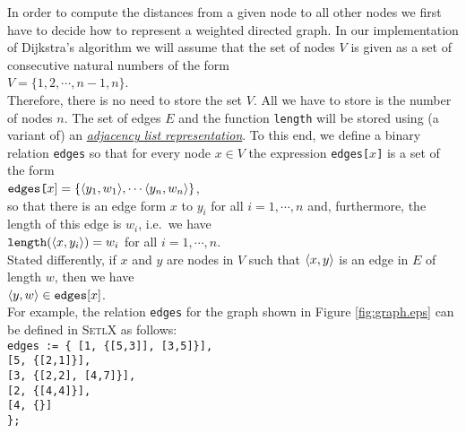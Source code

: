 In order to compute the distances from a given node to all other nodes we first have to decide how
to represent a weighted directed graph.  In our implementation of Dijkstra's algorithm we will
assume that the set of nodes $V$ is given as a set of consecutive natural numbers of the form
\\[0.2cm]
\hspace*{1.3cm}
$V = \{ 1, 2, \cdots, n-1, n \}$.
\\[0.2cm]
Therefore, there is no need to store the set $V$.  All we have to store is the number of nodes $n$.
The set of edges $E$ and the function \texttt{length} will be stored using (a variant of) an
\href{http://en.wikipedia.org/wiki/Adjacency_list}{\emph{adjacency list representation}}.
To this end, we define a binary relation \texttt{edges} so that for every node $x \in V$ the
expression \texttt{edges[$x$]} is a set of the form
\\[0.2cm]
\hspace*{1.3cm}
$\texttt{edges[}x\mathtt{]} = \{ \pair(y_1,w_1), \cdots \pair(y_n,w_n) \}$, 
\\[0.2cm]
so that there is an edge form $x$ to $y_i$ for all $i=1,\cdots,n$ and, furthermore, the length of
this edge is $w_i$, i.e.~we have 
\\[0.2cm]
\hspace*{1.3cm}
$\mathtt{length}(\pair(x,y_i)) = w_i$ \quad for all $i=1,\cdots,n$.
\\[0.2cm]
Stated differently, if $x$ and $y$ are nodes in $V$ such that $\pair(x,y)$ is an edge in $E$ of length
$w$, then we have
\\[0.2cm]
\hspace*{1.3cm}
$\pair(y,w) \in \mathtt{edges[}x\mathtt{]}$.
\\[0.2cm]
For example, the relation \texttt{edges} for the graph shown in Figure \ref{fig:graph.eps} can be
defined in \textsc{SetlX} as follows:
\\[0.2cm]
\hspace*{1.3cm}  \texttt{edges := \{ [1, \{[5,3]], [3,5]\}], \\
\hspace*{3.25cm}                     [5, \{[2,1]\}],         \\
\hspace*{3.25cm}                     [3, \{[2,2], [4,7]\}],  \\
\hspace*{3.25cm}                     [2, \{[4,4]\}],         \\
\hspace*{3.25cm}                     [4, \{\}]               \\
\hspace*{2.9cm}                  \};}


